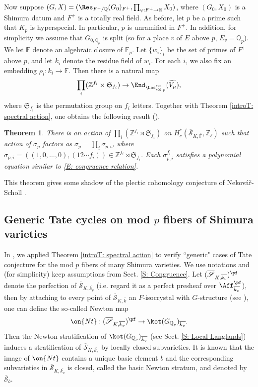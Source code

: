 \documentclass[11pt]{amsart}
\newtheorem{thm}{Theorem}[subsection]
\theoremstyle{definition}
\theoremstyle{definition}
\theoremstyle{definition}
\numberwithin{equation}{section}
\newcommand{\frakS}{{\mathfrak S}}
\newcommand{\bF}{{\mathbb F}}
\newcommand{\bQ}{{\mathbb Q}}
\newcommand{\bR}{{\mathbb R}}
\newcommand{\bZ}{{\mathbb Z}}
\newcommand{\scrS}{{\mathscr S}}
\begin{document}
Now suppose $(G,X)=(\Res_{F^+/\bQ}(G_0)_{F^+}, \prod_{\varphi :F^+\to \bR} X_0)$, where $(G_0,X_0)$ is a Shimura datum and $F^+$ is a totally real field. As before, let $p$ be a prime such that $K_p$ is hyperspecial. In particular, $p$ is unramified in $F^+$. 
In addition, for simplicity we assume that $G_{0,\bQ_p}$ is split (so for a place $v$ of $E$ above $p$, $E_v=\bQ_p$). We let $\bF$ denote an algebraic closure of $\bF_p$.
Let $\{w_i\}_i$ be the set of primes of $F^+$ above $p$, and let $k_i$ denote the residue field of $w_i$. For each $i$, we also fix an embedding $\rho_i: k_i\to\bF$. 
Then there is a natural map 
\[
\prod_i(\bZ^{f_i}\rtimes \frakS_{f_i})\to \End_{\Loc_{\CG,p}^{\ur}}(\widetilde{V_\mu}),
\] 
where $\frakS_{f_i}$ is the permutation group on $f_i$ letters.
Together with Theorem \ref{introT: spectral action}, one obtains the following result (\cite{Xiao-Zhu-Cycle}).
\begin{thm}
There is an action of $\prod_i(\bZ^{f_i}\rtimes \frakS_{f_i})$ on $H_c^*(\overline\scrS_{K,\overline{\bF}},\bZ_\ell)$ such that action of $\sigma_p$ factors as $\sigma_p=\prod_i \sigma_{p,i}$, where $\sigma_{p,i}=((1,0,\ldots,0), (12\cdots f_i))\in \bZ^{f_i}\rtimes\frakS_{f_i}$.
Each $\sigma_{p,i}^{f_i}$ satisfies a polynomial equation similar to \eqref{E: congruence relation}.
\end{thm}
This theorem gives some shadow of the plectic cohomology conjecture of Nekov\'a\v{r}-Scholl \cite{Nekovar-Scholl-Plectic}. 



\subsection{Generic Tate cycles on mod $p$ fibers of Shimura varieties}\label{S: Tate}
In \cite{Xiao-Zhu-Cycle}, 
we applied Theorem \ref{introT: spectral action} to verify ``generic" cases of Tate conjecture for the mod $p$ fibers of many Shimura varieties. We use notations and (for simplicity) keep assumptions from Sect. \ref{S: Congruence}. Let $(\overline{\mathscr S}_{K,\overline{k_v}})^\pf$ denote the perfection of $\overline{\mathscr S}_{K,\overline{k_v}}$ (i.e. regard it as a perfect presheaf over $\Aff_{\overline{k_v}}^{\pf}$), then by attaching to every point of $\overline{\mathscr S}_{K,\bar{k}}$ an $F$-isocrystal with $G$-structure (see \cite{Kisin-Integral-Model, Xiao-Zhu-Cycle}), one can define
the so-called Newton map 
\[
\on{Nt}: (\overline{\mathscr S}_{K,\overline{k_v}})^\pf\to \kot(G_{\bQ_p})_{\overline{k_v}}.
\] 
Then the Newton stratification of $\kot(G_{\bQ_p})_{\overline{k_v}}$ (see Sect. \ref{S: Local Langlands})
induces a stratification of $\overline{\mathscr S}_{K,\overline{k_v}}$ by locally closed subvarieties. It is known that the image of $\on{Nt}$ contains a unique basic element $b$ and the corresponding subvarieties in $\overline{\mathscr S}_{K,\overline{k_v}}$ is closed, called the basic Newton stratum, and denoted by $\overline{\scrS}_b$.
\end{document}
